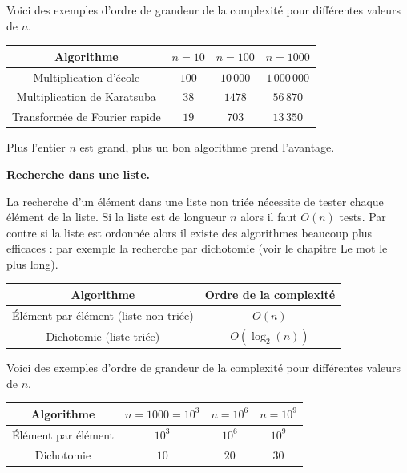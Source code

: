 \documentclass[11pt,class=report,crop=false]{standalone}
\begin{document}
\begin{cours}
Voici des exemples d'ordre de grandeur de la complexité pour différentes valeurs de $n$.
\begin{center}
	\begin{tabular}{|c|c|c|c|}\hline
		Algorithme  & $n=10$ & $n=100$ & $n=1000$  \\ \hline\hline
		Multiplication d'école & $100$ & $10\,000$ & $1\,000\,000$ \\ \hline
		Multiplication de Karatsuba & $38$ & $1478$ &  $56\,870$ \\ \hline
		Transformée de Fourier rapide & $19$ & $703$ & $13\,350$   \\\hline
	\end{tabular}
\end{center} 

Plus l'entier $n$ est grand, plus un bon algorithme prend l'avantage.

\bigskip

\textbf{Recherche dans une liste.}

La recherche d'un élément dans une liste non triée nécessite de tester chaque élément de la liste.
Si la liste est de longueur $n$ alors il faut $O(n)$ tests.
Par contre si la liste est ordonnée alors il existe des algorithmes beaucoup plus efficaces : par exemple la recherche par dichotomie (voir le chapitre \og{}Le mot le plus long\fg{}).


\begin{center}
	\begin{tabular}{|c|c|}\hline
		Algorithme  & Ordre de la complexité \\ \hline\hline
		\'Elément par élément (liste non triée) & $O(n)$ \\ \hline
		Dichotomie (liste triée) & $O(\log_2(n))$  \\ \hline
	\end{tabular}
\end{center}

Voici des exemples d'ordre de grandeur de la complexité pour différentes valeurs de $n$.
\begin{center}
	\begin{tabular}{|c|c|c|c|}\hline
		Algorithme  & $n=1000 =10^3$ & $n=10^6$ & $n=10^9$  \\ \hline\hline
		\'Elément par élément & $10^3$ & $10^6$ & $10^9$ \\ \hline
		Dichotomie & $10$ & $20$ &  $30$ \\ \hline
	\end{tabular}
\end{center} 


\end{cours}
\end{document}

